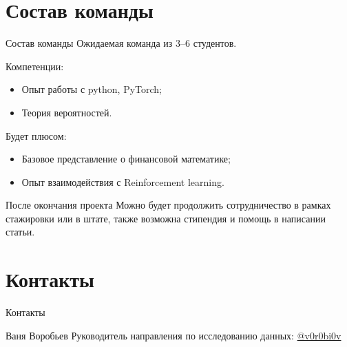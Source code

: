 \documentclass[10pt]{beamer}
\begin{document}
    \section{Состав команды}
    \begin{frame}{Состав команды}
        Ожидаемая команда из 3--6 студентов.
        
        Компетенции:
        \begin{itemize}
            \item Опыт работы с python, PyTorch;
            \item Теория вероятностей.
        \end{itemize}

        Будет плюсом:
        \begin{itemize}
            \item Базовое представление о финансовой математике;
            \item Опыт взаимодействия с Reinforcement learning.
        \end{itemize}

        \begin{block}{После окончания проекта}
            Можно будет продолжить сотрудничество в рамках стажировки или в штате, также возможна стипендия и помощь в написании статьи.
        \end{block}
    \end{frame}

    \section{Контакты}
    \begin{frame}{Контакты}
        \begin{block}{Ваня Воробьев}
            Руководитель направления по исследованию данных: \href{https://t.me/v0r0bi0v}{@v0r0bi0v}
        \end{block}
    \end{frame}
\end{document}
